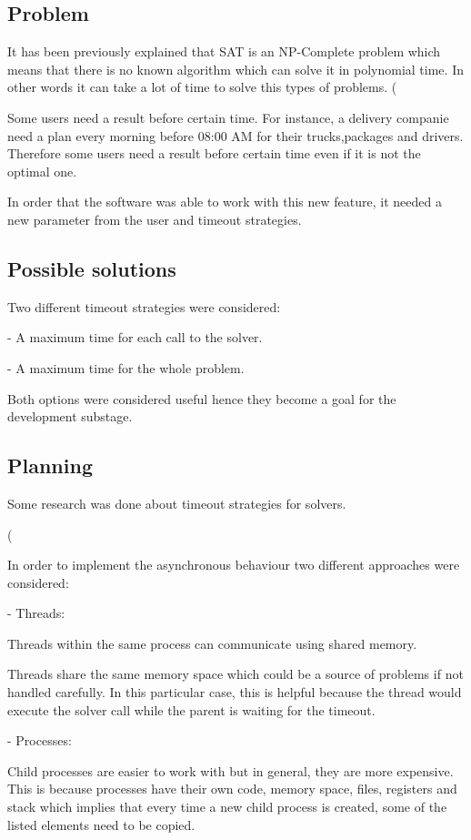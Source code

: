 \subsection{Problem}
It has been previously explained that SAT is an NP-Complete problem which means that there is no known algorithm which can solve it in polynomial time. In other words it can take a lot of time to solve this types of problems. (%

Some users need a result before certain time. For instance, a delivery companie need a plan every morning before 08:00 AM for their trucks,packages and drivers. Therefore some users need a result before certain time even if it is not the optimal one.  

In order that the software was able to work with this new feature, it needed a new parameter from the user and timeout strategies.

\subsection{Possible solutions}
Two different timeout strategies were considered:  

- A maximum time for each call to the solver. 

- A maximum time for the whole problem. 

Both options were considered useful hence they become a goal for the development substage.  

\subsection{Planning}
Some research was done about timeout strategies for solvers.  

(%

In order to implement the asynchronous behaviour two different approaches were considered:  

- Threads: 

Threads within the same process can communicate using shared memory.  

Threads share the same memory space which could be a source of problems if not handled carefully. In this particular case, this is helpful because the thread would execute the solver call while the parent is waiting for the timeout.  



- Processes: 

Child processes are easier to work with but in general, they are more expensive. This is because processes have their own code, memory space, files, registers and stack which implies that every time a new child process is created, some of the listed elements need to be copied.  





